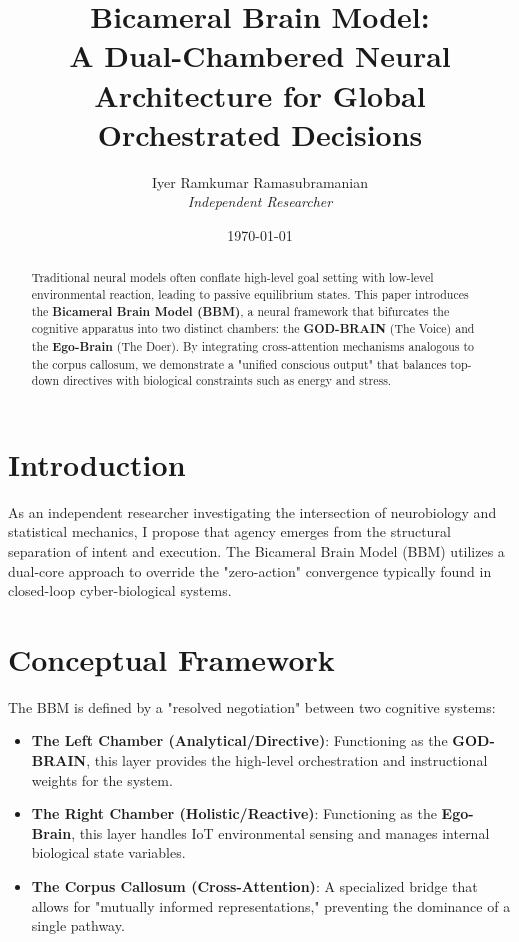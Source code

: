\documentclass[12pt]{article}
\title{\textbf{Bicameral Brain Model: \\ A Dual-Chambered Neural Architecture for Global Orchestrated Decisions}}
\author{Iyer Ramkumar Ramasubramanian \\ \textit{Independent Researcher}}
\date{\today}
\begin{document}
\maketitle

\begin{abstract}
Traditional neural models often conflate high-level goal setting with low-level environmental reaction, leading to passive equilibrium states. This paper introduces the \textbf{Bicameral Brain Model (BBM)}, a neural framework that bifurcates the cognitive apparatus into two distinct chambers: the \textbf{GOD-BRAIN} (The Voice) and the \textbf{Ego-Brain} (The Doer). By integrating cross-attention mechanisms analogous to the corpus callosum, we demonstrate a "unified conscious output" that balances top-down directives with biological constraints such as energy and stress.
\end{abstract}

\section{Introduction}
As an independent researcher investigating the intersection of neurobiology and statistical mechanics, I propose that agency emerges from the structural separation of intent and execution. The Bicameral Brain Model (BBM) utilizes a dual-core approach to override the "zero-action" convergence typically found in closed-loop cyber-biological systems.

\section{Conceptual Framework}

The BBM is defined by a "resolved negotiation" between two cognitive systems:

\begin{itemize}
\item \textbf{The Left Chamber (Analytical/Directive)}: Functioning as the \textbf{GOD-BRAIN}, this layer provides the high-level orchestration and instructional weights for the system.
\item \textbf{The Right Chamber (Holistic/Reactive)}: Functioning as the \textbf{Ego-Brain}, this layer handles IoT environmental sensing and manages internal biological state variables.
\item \textbf{The Corpus Callosum (Cross-Attention)}: A specialized bridge that allows for "mutually informed representations," preventing the dominance of a single pathway.
\end{itemize}
\end{document}

